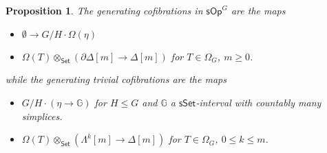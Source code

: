 \documentclass[a4paper,10pt
,draft
]{article}%
\numberwithin{equation}{section}
\numberwithin{figure}{section}
\newtheorem{proposition}[equation]{Proposition}%
\theoremstyle{definition} %
\newcommand{\Set}{\ensuremath{\mathsf{Set}}}
\newcommand{\sSet}{\ensuremath{\mathsf{sSet}}}%
\newcommand{\F}{\ensuremath{\mathcal F}}
\newcommand{\1}{\ensuremath{\mathbbm 1}}%
\begin{document}
\begin{proposition}
      The generating cofibrations in $\mathsf{sOp}^G$
      are the maps
      \begin{itemize}
      \item[(OC1)] $\emptyset \to G/H \cdot \Omega(\eta)$ %
      \item[(OC2)] $\Omega(T) \otimes_{\Set} (\partial \Delta[m] \to \Delta[m])$
            for $T \in \Omega_G$, $m \geq 0$.
      \end{itemize}
      while the generating trivial cofibrations are the maps 
      \begin{itemize}
      \item[(OA1)] 
            $G/H \cdot \left(\eta \to \mathbb{G}\right)$ %
            for $H \leq G$ and $\mathbb G$ a $\sSet$-interval with countably many simplices.
      \item[(OA2)] 
            $\Omega(T) \otimes_{\Set} (\Lambda^k[m] \to \Delta[m])$
            for $T \in \Omega_G$, $0 \leq k \leq m$.
      \end{itemize}
\end{proposition}
\end{document}
